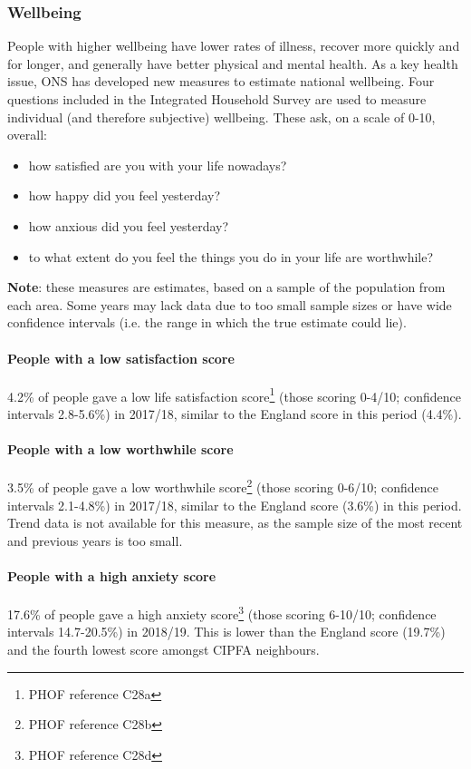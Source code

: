 \subsubsection{Wellbeing}
People with higher wellbeing have lower rates of illness, recover more quickly and for longer, and generally have better physical and mental health. As a key health issue, ONS has developed new measures to estimate national wellbeing. Four questions included in the Integrated Household Survey are used to measure individual (and therefore subjective) wellbeing. These ask, on a scale of 0-10, overall:

\begin{itemize}[noitemsep]
    \item how satisfied are you with your life nowadays?
    \item how happy did you feel yesterday?
    \item how anxious did you feel yesterday?
    \item to what extent do you feel the things you do in your life are worthwhile?
\end{itemize}

{\bf Note}: these measures are estimates, based on a sample of the population from each area. Some years may lack data due to too small sample sizes or have wide confidence intervals (i.e. the range in which the true estimate could lie).

\paragraph{People with a low satisfaction score} 4.2\% of people gave a low life satisfaction score\footnote{PHOF reference C28a} (those scoring 0-4/10; confidence intervals 2.8-5.6\%) in 2017/18, similar to the England score in this period (4.4\%).

\paragraph{People with a low worthwhile score} 3.5\% of people gave a low worthwhile score\footnote{PHOF reference C28b} (those scoring 0-6/10; confidence intervals 2.1-4.8\%) in 2017/18, similar to the England score (3.6\%) in this period. Trend data is not available for this measure, as the sample size of the most recent and previous years is too small.

\paragraph{People with a high anxiety score} 17.6\% of people gave a high anxiety score\footnote{PHOF reference C28d} (those scoring 6-10/10; confidence intervals 14.7-20.5\%) in 2018/19. This is lower than the England score (19.7\%) and the fourth lowest score amongst CIPFA neighbours.

